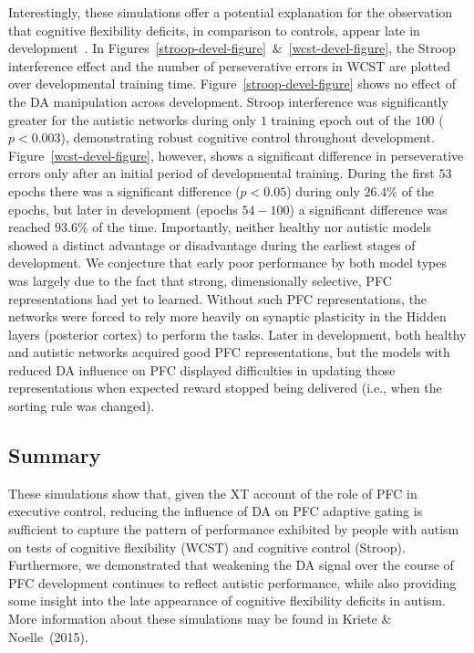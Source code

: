 
Interestingly, these simulations offer a potential explanation for the observation that cognitive flexibility deficits, in comparison to controls, appear late in development~\cite{GriffithEM:1999:AutismYoungED}. In Figures~\ref{stroop-devel-figure}~\&~\ref{wcst-devel-figure}, the Stroop interference effect and the number of perseverative errors in WCST are plotted over developmental training time. Figure~\ref{stroop-devel-figure} shows no effect of the DA manipulation across development. Stroop interference was significantly greater for the autistic networks during only $1$ training epoch out of the $100$ ($p < 0.003$), demonstrating robust cognitive control throughout development. Figure~\ref{wcst-devel-figure}, however, shows a significant difference in perseverative errors only after an initial period of developmental training. During the first $53$ epochs there was a significant difference ($p < 0.05$) during only $26.4\%$ of the epochs, but later in development (epochs $54-100$) a significant difference was reached $93.6\%$ of the time. Importantly, neither healthy nor autistic models showed a distinct advantage or disadvantage during the earliest stages of development. We conjecture that early poor performance by both model types was largely due to the fact that strong, dimensionally selective, PFC representations had yet to learned. Without such PFC representations, the networks were forced to rely more heavily on synaptic plasticity in the Hidden layers (posterior cortex) to perform the tasks. Later in development, both healthy and autistic networks acquired good PFC representations, but the models with reduced DA influence on PFC displayed difficulties in updating those representations when expected reward stopped being delivered (i.e., when the sorting rule was changed).

\subsection{Summary}

These simulations show that, given the XT account of the role of PFC in executive control, reducing the influence of DA on PFC adaptive gating is sufficient to capture the pattern of performance exhibited by people with autism on tests of cognitive flexibility (WCST) and cognitive control (Stroop). Furthermore, we demonstrated that weakening the DA signal over the course of PFC development continues to reflect autistic performance, while also providing some insight into the late appearance of cognitive flexibility deficits in autism. More information about these simulations may be found in Kriete \& Noelle~(2015).\nocite{KrieteT:2015:ED}

